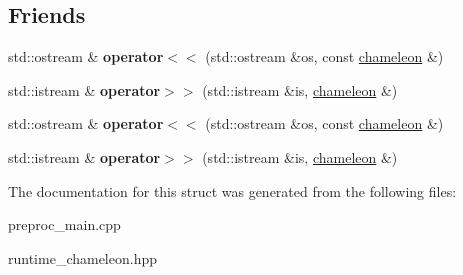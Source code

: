 \subsection*{Friends}
\begin{DoxyCompactItemize}
\item 
\hypertarget{structtml_1_1runtime_1_1chameleon_a2ca8a1edf43ca20d170d58bad3bc33ab}{std\+::ostream \& {\bfseries operator$<$$<$} (std\+::ostream \&os, const \hyperlink{structtml_1_1runtime_1_1chameleon}{chameleon} \&)}\label{structtml_1_1runtime_1_1chameleon_a2ca8a1edf43ca20d170d58bad3bc33ab}

\item 
\hypertarget{structtml_1_1runtime_1_1chameleon_ad087011c1fa873a49431e0434ae5ca64}{std\+::istream \& {\bfseries operator$>$$>$} (std\+::istream \&is, \hyperlink{structtml_1_1runtime_1_1chameleon}{chameleon} \&)}\label{structtml_1_1runtime_1_1chameleon_ad087011c1fa873a49431e0434ae5ca64}

\item 
\hypertarget{structtml_1_1runtime_1_1chameleon_a2ca8a1edf43ca20d170d58bad3bc33ab}{std\+::ostream \& {\bfseries operator$<$$<$} (std\+::ostream \&os, const \hyperlink{structtml_1_1runtime_1_1chameleon}{chameleon} \&)}\label{structtml_1_1runtime_1_1chameleon_a2ca8a1edf43ca20d170d58bad3bc33ab}

\item 
\hypertarget{structtml_1_1runtime_1_1chameleon_ad087011c1fa873a49431e0434ae5ca64}{std\+::istream \& {\bfseries operator$>$$>$} (std\+::istream \&is, \hyperlink{structtml_1_1runtime_1_1chameleon}{chameleon} \&)}\label{structtml_1_1runtime_1_1chameleon_ad087011c1fa873a49431e0434ae5ca64}

\end{DoxyCompactItemize}


The documentation for this struct was generated from the following files\+:\begin{DoxyCompactItemize}
\item 
preproc\+\_\+main.\+cpp\item 
runtime\+\_\+chameleon.\+hpp\end{DoxyCompactItemize}

